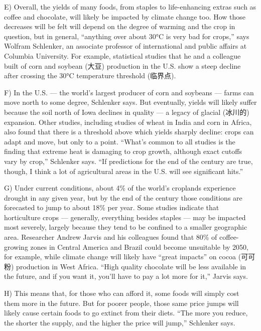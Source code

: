 \documentclass[UTF8,11pt]{ctexart}
\begin{document}
E) Overall, the yields of many foods, from staples to life-enhancing extras such as coffee and chocolate, will likely be impacted by climate change too. How those decreases will be felt will depend on the degree of warming and the crop in question, but in general, “anything over about 30°C is very bad for crops,” says Wolfram Schlenker, an associate professor of international and public affairs at Columbia University. For example, statistical studies that he and a colleague built of corn and soybean (大豆) production in the U.S. show a steep decline after crossing the 30°C temperature threshold (临界点).


F) In the U.S. — the world’s largest producer of corn and soybeans — farms can move north to some degree, Schlenker says. But eventually, yields will likely suffer because the soil north of Iowa declines in quality — a legacy of glacial (冰川的) expansion. Other studies, including studies of wheat in India and corn in Africa, also found that there is a threshold above which yields sharply decline: crops can adapt and move, but only to a point. “What’s common to all studies is the finding that extreme heat is damaging to crop growth, although exact cutoffs vary by crop,” Schlenker says. “If predictions for the end of the century are true, though, I think a lot of agricultural areas in the U.S. will see significant hits.”


G) Under current conditions, about 4\% of the world’s croplands experience drought in any given year, but by the end of the century those conditions are forecasted to jump to about 18\% per year. Some studies indicate that horticulture crops — generally, everything besides staples — may be impacted most severely, largely because they tend to be confined to a smaller geographic area. Researcher Andrew Jarvis and his colleagues found that 80\% of coffee-growing zones in Central America and Brazil could become unsuitable by 2050, for example, while climate change will likely have “great impacts” on cocoa (可可粉) production in West Africa. “High quality chocolate will be less available in the future, and if you want it, you’ll have to pay a lot more for it,” Jarvis says.


H) This means that, for those who can afford it, some foods will simply cost them more in the future. But for poorer people, those same price jumps will likely cause certain foods to go extinct from their diets. “The more you reduce, the shorter the supply, and the higher the price will jump,” Schlenker says.
\end{document}
